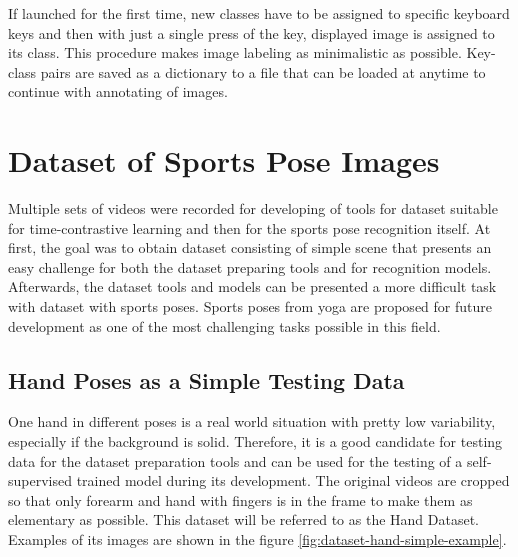 If launched for the first time, new classes have to be assigned to specific keyboard keys and then with just a single press of the key, displayed image is assigned to its class. This procedure makes image labeling as minimalistic as possible. Key-class pairs are saved as a dictionary to a file that can be loaded at anytime to continue with annotating of images.

\section{\label{sec:dataset-sports-poses}Dataset of Sports Pose Images}

Multiple sets of videos were recorded for developing of tools for dataset suitable for time-contrastive learning and then for the sports pose recognition itself. At first, the goal was to obtain dataset consisting of simple scene that presents an easy challenge for both the dataset preparing tools and for recognition models. Afterwards, the dataset tools and models can be presented a more difficult task with dataset with sports poses. Sports poses from yoga are proposed for future development as one of the most challenging tasks possible in this field.

\subsection{Hand Poses as a Simple Testing Data}

One hand in different poses is a real world situation with pretty low variability, especially if the background is solid. Therefore, it is a good candidate for testing data for the dataset preparation tools and can be used for the testing of a self-supervised trained model during its development. The original videos are cropped so that only forearm and hand with fingers is in the frame to make them as elementary as possible. This dataset will be referred to as the Hand Dataset. Examples of its images are shown in the figure \ref{fig:dataset-hand-simple-example}.


